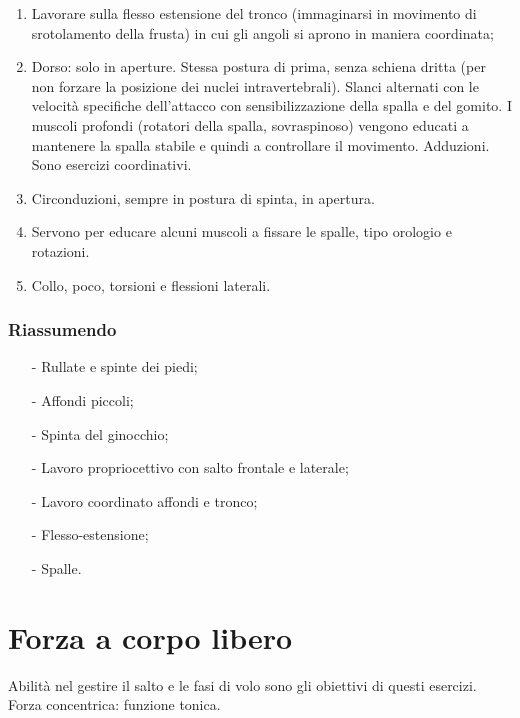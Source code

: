 \begin{enumerate}
\item Lavorare sulla flesso estensione del tronco (immaginarsi in movimento di srotolamento della frusta)
in cui gli angoli si aprono in maniera coordinata;
\item Dorso: solo in aperture. Stessa postura di prima, senza schiena dritta (per non forzare la posizione
dei nuclei intravertebrali). Slanci alternati con le velocità specifiche dell'attacco con
sensibilizzazione della spalla e del gomito. I muscoli profondi (rotatori della spalla, sovraspinoso)
vengono educati a mantenere la spalla stabile e quindi a controllare il movimento. Adduzioni. Sono
esercizi coordinativi.
\item Circonduzioni, sempre in postura di spinta, in apertura.
\item Servono per educare alcuni muscoli a fissare le spalle, tipo orologio e rotazioni.
\item Collo, poco, torsioni e flessioni laterali.
\end{enumerate}

\subsubsection{Riassumendo}
\begin{itemize}
\item[-]Rullate e spinte dei piedi;
\item[-]Affondi piccoli;
\item[-]Spinta del ginocchio;
\item[-]Lavoro propriocettivo con salto frontale e laterale;
\item[-]Lavoro coordinato affondi e tronco;
\item[-]Flesso-estensione;
\item[-]Spalle.
\end{itemize}


\section{Forza a corpo libero}
Abilità nel gestire il salto e le fasi di volo sono gli obiettivi di questi esercizi.
Forza concentrica: funzione tonica.
